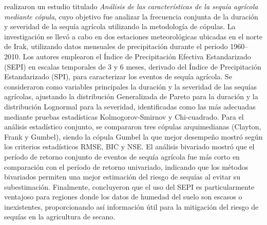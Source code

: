 \textcite{Hasan2022} realizaron un estudio titulado \emph{Análisis de las características de la sequía agrícola mediante cópula}, cuyo objetivo fue analizar la frecuencia conjunta de la duración y severidad de la sequía agrícola utilizando la metodología de cópulas. La investigación se llevó a cabo en dos estaciones meteorológicas ubicadas en el norte de Irak, utilizando datos mensuales de precipitación durante el periodo 1960–2010. Los autores emplearon el Índice de Precipitación Efectiva Estandarizado (SEPI) en escalas temporales de 3 y 6 meses, derivado del Índice de Precipitación Estandarizado (SPI), para caracterizar los eventos de sequía agrícola. Se consideraron como variables principales la duración y la severidad de las sequías agrícolas, ajustando la distribución Generalizada de Pareto para la duración y la distribución Lognormal para la severidad, identificadas como las más adecuadas mediante pruebas estadísticas Kolmogorov-Smirnov y Chi-cuadrado. Para el análisis estadístico conjunto, se compararon tres cópulas arquimedianas (Clayton, Frank y Gumbel), siendo la cópula Gumbel la que mejor desempeño mostró según los criterios estadísticos RMSE, BIC y NSE. El análisis bivariado mostró que el período de retorno conjunto de eventos de sequía agrícola fue más corto en comparación con el período de retorno univariado, indicando que los métodos bivariados permiten una mejor estimación del riesgo de sequías al evitar su subestimación. Finalmente, concluyeron que el uso del SEPI es particularmente ventajoso para regiones donde los datos de humedad del suelo son escasos o inexistentes, proporcionando así información útil para la mitigación del riesgo de sequías en la agricultura de secano.

